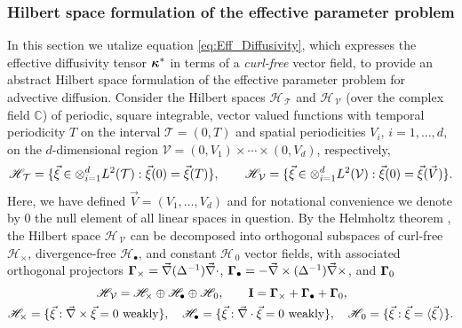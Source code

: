 \documentclass[11pt]{amsart}
\newcommand{\Ib}{\mathbf{I}}
\newcommand{\Tc}{\mathcal{T}}
\newcommand{\Vc}{\mathcal{V}}
\newcommand{\Hs}{\mathscr{H}}
\newcommand\bkappa{\mbox{\boldmath${\kappa}$}}
\newcommand\bGamma{\mbox{\boldmath${\Gamma}$}}
\begin{document}
\subsubsection{Hilbert space formulation of the effective parameter
  problem} \label{sec:Hilbert_Space} 
%
In this section we utalize equation \eqref{eq:Eff_Diffusivity}, which
expresses the effective diffusivity tensor $\bkappa^*$ in terms of a
\emph{curl-free} vector field, to provide an abstract Hilbert
space formulation of the effective parameter problem for advective
diffusion. Consider the Hilbert spaces $\Hs_{\,\Tc}$ and $\Hs_{\,\Vc}$
(over the complex field 
$\mathbb{C}$) of periodic, square integrable, vector valued functions
with temporal periodicity $T$ on the interval $\Tc=(0,T)$ and spatial
periodicities $V_i$, $i=1,\ldots,d$, on the $d$-dimensional region 
$\Vc=(0,V_1)\times\cdots\times(0,V_d)$, respectively,  
%
\begin{align}
  \Hs_{\,\Tc}=\{ 
     \vec{\xi}\in\otimes_{i=1}^dL^2(\Tc):
     \vec{\xi}(0)=\vec{\xi}(T) 
                        \}, \qquad
  \Hs_{\,\Vc}=\{ 
     \vec{\xi}\in\otimes_{i=1}^dL^2(\Vc):
     \vec{\xi}(0)=\vec{\xi}(\vec{V}) 
                        \}. \notag
\end{align}
%
Here, we have defined $\vec{V}=(V_1,\ldots,V_d)$ and for notational
convenience we denote by $0$ the null element of all linear spaces in
question. By the Helmholtz theorem \cite{Denaro:2003:0271,Bhatia:IEE:1077},
the Hilbert space $\Hs_{\,\Vc}$ can be decomposed into orthogonal
subspaces of curl-free $\Hs_\times$, divergence-free $\Hs_\bullet$, and constant
$\Hs_{\,0}$ vector fields, with associated orthogonal projectors
$\bGamma_\times=\vec{\nabla}(\Delta^{-1})\vec{\nabla}\cdot$,
$\bGamma_\bullet=-\vec{\nabla}\times(\Delta^{-1})\vec{\nabla}\times$, and 
$\bGamma_0$
\cite{Fannjiang:SIAM_JAM:333,MILTON:2002:TC}    
%
\begin{align}\label{eq:Helmholtz}
  &\Hs_{\,\Vc}=\Hs_\times\oplus\Hs_\bullet\oplus\Hs_{\,0},\qquad
  \Ib=\bGamma_\times+\bGamma_\bullet+\bGamma_0, \\  
  \Hs_\times=\{\vec{\xi}:\vec{\nabla}\times\vec{\xi}&=0 \text{ weakly}\}, \quad
  \Hs_\bullet
      =\{\vec{\xi}:\vec{\nabla}\cdot\vec{\xi}=0 \text{ weakly}\},   \quad
  \Hs_{\,0}
      =\{\vec{\xi}:\vec{\xi}=\langle\vec{\xi}\,\rangle\}.
     \notag  
\end{align}
%
\end{document}
